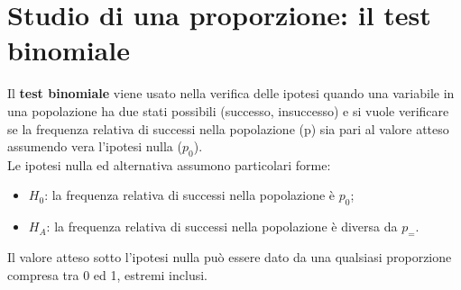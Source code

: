 \documentclass[10pt, draft]{book}
\newcommand{\tightlist}{%
\setlength{\itemsep}{1pt}\setlength{\parskip}{0pt}\setlength{\parsep}{0pt}}
\begin{document}
\section{Studio di una proporzione: il test binomiale}

Il \textbf{test binomiale} viene usato nella verifica delle ipotesi quando una variabile in una popolazione ha due stati possibili (successo, insuccesso) e si vuole verificare se la frequenza relativa di successi nella popolazione (p) sia pari al valore atteso assumendo vera l'ipotesi nulla ($p_0$).
\\
Le ipotesi nulla ed alternativa assumono particolari forme:
\begin{itemize} \tightlist
\item $H_0$: la frequenza relativa di successi nella popolazione è $p_0$;
\item $H_A$: la frequenza relativa di successi nella popolazione è diversa da $p_=$.
\end{itemize}
Il valore atteso sotto l'ipotesi nulla può essere dato da una qualsiasi proporzione compresa tra 0 ed 1, estremi inclusi.
\end{document}
